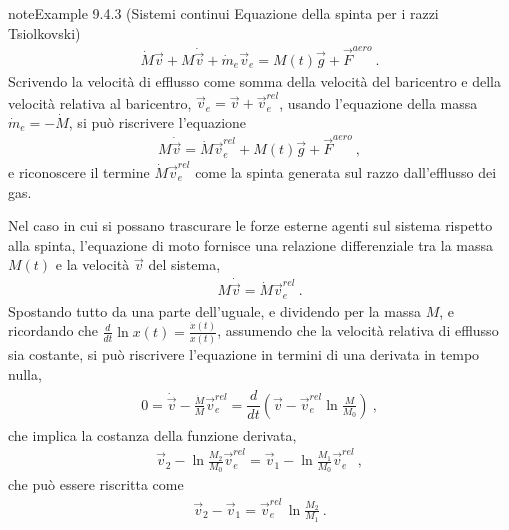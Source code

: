 \documentclass[letterpaper,10pt,italian]{jupyterBook}
\begin{document}
\begin{sphinxadmonition}{note}{Example 9.4.3 (Sistemi continui \sphinxhyphen{} Equazione della spinta per i razzi \sphinxhyphen{} Tsiolkovski)}
\begin{equation*}
\begin{split}\dot{M} \vec{v} + M \dot{\vec{v}} + \dot{m}_e \vec{v}_e = M(t) \vec{g} + \vec{F}^{aero} \ .\end{split}
\end{equation*}
\sphinxAtStartPar
Scrivendo la velocità di efflusso come somma della velocità del baricentro e della velocità relativa al baricentro, \(\vec{v}_e = \vec{v} + \vec{v}_e^{rel}\), usando l’equazione della massa \(\dot{m}_e = - \dot{M}\), si può riscrivere l’equazione
\begin{equation*}
\begin{split}M \dot{\vec{v}} = \dot{M} \vec{v}_e^{rel} + M(t) \vec{g} + \vec{F}^{aero} \ ,\end{split}
\end{equation*}
\sphinxAtStartPar
e riconoscere il termine \(\dot{M} \vec{v}_e^{rel}\) come la spinta generata sul razzo dall’efflusso dei gas.

\sphinxAtStartPar
Nel caso in cui si possano trascurare le forze esterne agenti sul sistema rispetto alla spinta, l’equazione di moto fornisce una relazione differenziale tra la massa \(M(t)\) e la velocità \(\vec{v}\) del sistema,
\begin{equation*}
\begin{split}M \dot{\vec{v}} = \dot{M} \vec{v}_e^{rel} \ .\end{split}
\end{equation*}
\sphinxAtStartPar
Spostando tutto da una parte dell’uguale, e dividendo per la massa \(M\), e ricordando che \(\frac{d}{dt} \ln x(t) = \frac{\dot{x}(t)}{x(t)}\), assumendo che la velocità relativa di efflusso sia costante, si può riscrivere l’equazione in termini di una derivata in tempo nulla,
\begin{equation*}
\begin{split}\begin{aligned}
  0 = \dot{\vec{v}} - \frac{\dot{M}}{M} \vec{v}_e^{rel} = \dfrac{d}{dt} \left( \vec{v} - \vec{v}^{rel}_e \ln \frac{M}{M_0} \right) \ ,
\end{aligned}\end{split}
\end{equation*}
\sphinxAtStartPar
che implica la costanza della funzione derivata,
\begin{equation*}
\begin{split}\vec{v}_2 - \ln \frac{M_2}{M_0} \vec{v}^{rel}_e = \vec{v}_1 - \ln \frac{M_1}{M_0} \vec{v}^{rel}_e \ ,\end{split}
\end{equation*}
\sphinxAtStartPar
che può essere riscritta come
\begin{equation*}
\begin{split}\vec{v}_2 - \vec{v}_1 =  \vec{v}^{rel}_e \, \ln \frac{M_2}{M_1}\ .\end{split}
\end{equation*}\end{sphinxadmonition}
\end{document}
